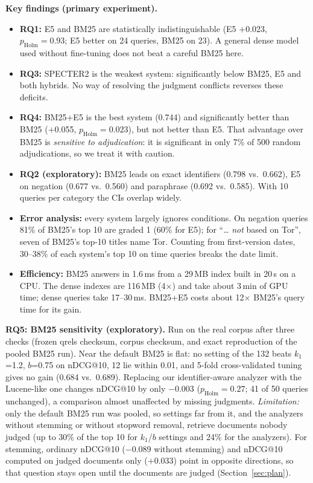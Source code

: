 \documentclass[10pt,a4paper]{article}
\begin{document}
\textbf{Key findings (primary experiment).}
\begin{itemize}
\item \textbf{RQ1:} E5 and BM25 are statistically indistinguishable (E5 $+$0.023, $p_{\text{Holm}}=0.93$; E5
better on 24 queries, BM25 on 23). A general dense model used without fine-tuning does not beat a careful BM25 here.
\item \textbf{RQ3:} SPECTER2 is the weakest system: significantly below BM25, E5 and both hybrids. No way of
resolving the judgment conflicts reverses these deficits.
\item \textbf{RQ4:} BM25+E5 is the best system (0.744) and significantly better than BM25 ($+$0.055,
$p_{\text{Holm}}=0.023$), but not better than E5. That advantage over BM25 is \emph{sensitive to adjudication}:
it is significant in only 7\% of 500 random adjudications, so we treat it with caution.
\item \textbf{RQ2 (exploratory):} BM25 leads on exact identifiers (0.798 vs.\ 0.662), E5 on negation (0.677 vs.\
0.560) and paraphrase (0.692 vs.\ 0.585). With 10 queries per category the CIs overlap widely.
\item \textbf{Error analysis:} every system largely ignores conditions. On negation queries 81\% of BM25's top 10
are graded 1 (60\% for E5); for ``\ldots{} \emph{not} based on Tor'', seven of BM25's top-10 titles name Tor.
Counting from first-version dates, 30--38\% of each system's top 10 on time queries breaks the date limit.
\item \textbf{Efficiency:} BM25 answers in 1.6\,ms from a 29\,MB index built in 20\,s on a CPU. The dense
indexes are 116\,MB (4$\times$) and take about 3\,min of GPU time; dense queries take 17--30\,ms. BM25+E5
costs about 12$\times$ BM25's query time for its gain.
\end{itemize}

\textbf{RQ5: BM25 sensitivity (exploratory).} Run on the real corpus after three checks (frozen qrels
checksum, corpus checksum, and exact reproduction of the pooled BM25 run). Near the default BM25 is flat: no
setting of the 132 beats $k_1$=1.2, $b$=0.75 on nDCG@10, 12 lie within 0.01, and 5-fold cross-validated tuning
gives no gain (0.684 vs.\ 0.689). Replacing our identifier-aware analyzer with the Lucene-like one changes
nDCG@10 by only $-$0.003 ($p_{\text{Holm}}=0.27$; 41 of 50 queries unchanged), a comparison almost unaffected by
missing judgments. \emph{Limitation:} only the default BM25 run was pooled, so settings far from it, and the
analyzers without stemming or without stopword removal, retrieve documents nobody judged (up to 30\% of the top 10
for $k_1$/$b$ settings and 24\% for the analyzers). For
stemming, ordinary nDCG@10 ($-$0.089 without stemming) and nDCG@10 computed on judged documents only
($+$0.033) point in opposite directions, so that question stays open until the documents are judged
(Section~\ref{sec:plan}).
\end{document}
